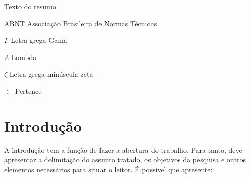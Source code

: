 \documentclass[12pt,oneside,a4paper,chapter=TITLE,section=TITLE,sumario=tradicional]{abntex2}
\begin{document}

\imprimircapa
\imprimirfolhaderosto

\begin{resumo}
    Texto do resumo.
    
\end{resumo}

\listadefiguras
\listadegraficos
\listadetabelas
\listadequadros
\listadecodigos
\listadealgoritmos

\begin{siglas}
  \item[ABNT] Associação Brasileira de Normas Técnicas
\end{siglas}

\begin{simbolos}
  \item[$ \Gamma $] Letra grega Gama
  \item[$ \Lambda $] Lambda
  \item[$ \zeta $] Letra grega minúscula zeta
  \item[$ \in $] Pertence
\end{simbolos}

\sumario

\textual

\chapter{Introdução}
\label{cap:introducao}


A introdução tem a função de fazer a abertura do trabalho. Para tanto, deve 
apresentar a delimitação do assunto tratado, os objetivos da pesquisa e outros 
elementos necessários para situar o leitor. É possível que apresente:
\end{document}
